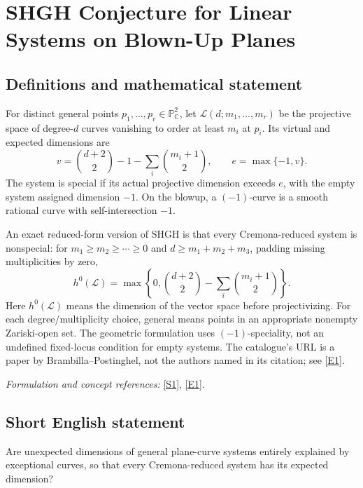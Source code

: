 \documentclass[11pt]{article}
\begin{document}
\section*{\texorpdfstring{SHGH Conjecture for Linear Systems on Blown-Up Planes}{SHGH Conjecture for Linear Systems on Blown-Up Planes}}\label{30001233}
\subsection{Definitions and mathematical statement}
For distinct general points $p_1,\ldots,p_r\in{\mathbb{P}}^2_{{\mathbb{C}}}$, let $\mathcal L(d;m_1,\ldots,m_r)$ be the projective space of degree-$d$ curves vanishing to order at least $m_i$ at $p_i$. Its virtual and expected dimensions are
\[
 v=\binom{d+2}{2}-1-\sum_i\binom{m_i+1}{2},
 \qquad e=\max\{-1,v\}.
\]
The system is special if its actual projective dimension exceeds $e$, with the empty system assigned dimension $-1$. On the blowup, a $(-1)$-curve is a smooth rational curve with self-intersection $-1$.

An exact reduced-form version of SHGH is that every Cremona-reduced system is nonspecial: for $m_1\ge m_2\ge\cdots\ge0$ and $d\ge m_1+m_2+m_3$, padding missing multiplicities by zero,
\[
 h^0(\mathcal L)=\max\left\{0,\binom{d+2}{2}
                                  -\sum_i\binom{m_i+1}{2}\right\}.
\]
Here $h^0(\mathcal L)$ means the dimension of the vector space before projectivizing. For each degree/multiplicity choice, general means points in an appropriate nonempty Zariski-open set. The geometric formulation uses $(-1)$-speciality, not an undefined fixed-locus condition for empty systems. The catalogue's URL is a paper by Brambilla--Postinghel, not the authors named in its citation; see \href{https://link.springer.com/article/10.1007/s40574-025-00468-5}{[E1]}.
\par\smallskip\textit{Formulation and concept references:} \href{https://link.springer.com/article/10.1007/s40574-025-00468-5}{[S1]}, \href{https://link.springer.com/article/10.1007/s40574-025-00468-5}{[E1]}.

\subsection{Short English statement}
Are unexpected dimensions of general plane-curve systems entirely explained by exceptional curves, so that every Cremona-reduced system has its expected dimension?
\end{document}
